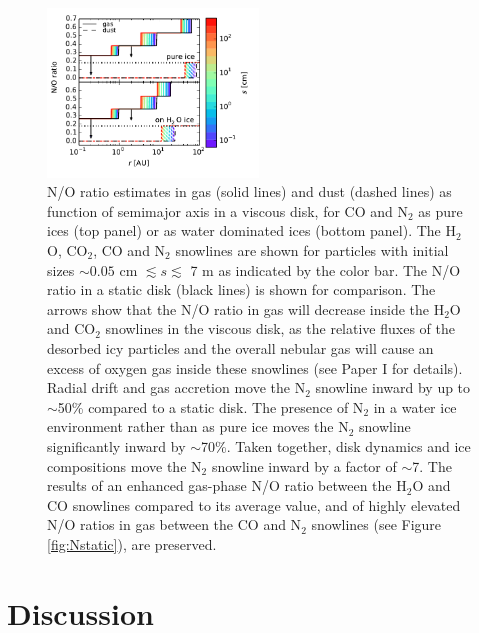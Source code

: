 \documentclass[apj]{emulateapj}
\begin{document}
\begin{figure}[h!]
\centering
\includegraphics[width=0.5\textwidth]{N_O_water_ice_many.pdf}
\caption{N/O ratio estimates in gas (solid lines) and dust (dashed lines) as function of semimajor axis in a viscous disk, for CO and N$_2$ as pure ices (top panel) or as water dominated ices (bottom panel). The H$_2$O, CO$_2$, CO and N$_2$ snowlines are shown for particles with initial sizes $\sim0.05$ cm $\lesssim s \lesssim$ 7 m as indicated by the color bar. The N/O ratio in a static disk (black lines) is shown for comparison. The arrows show that the N/O ratio in gas will decrease inside the H$_2$O and CO$_2$ snowlines in the viscous disk, as the relative fluxes of the desorbed icy
particles and the overall nebular gas will cause an excess of oxygen gas inside these snowlines (see Paper I for details). Radial drift and gas accretion move the N$_2$ snowline inward by up to $\sim$50\% compared to a static disk. The presence of N$_2$ in a water ice environment rather than as pure ice moves the N$_2$ snowline significantly inward by $\sim$70\%. Taken together, disk dynamics and ice compositions move the N$_2$ snowline inward by a factor of $\sim$7. The results of an enhanced gas-phase N/O ratio between the H$_2$O and CO snowlines compared to its average value, and of highly elevated N/O ratios in gas between the CO and N$_2$ snowlines (see Figure \ref{fig:Nstatic}), are preserved.}  
\label{fig:NO_ratio}
\end{figure}





\section{Discussion}
\label{sec:discussion}
\end{document}
